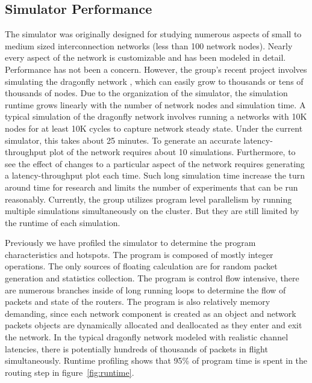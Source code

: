 \subsection{Simulator Performance}
The simulator was originally designed for studying numerous aspects of small to medium sized interconnection networks (less than 100 network nodes). Nearly every aspect of the network is customizable and has been modeled in detail. Performance has not been a concern. However, the group's recent project involves simulating the dragonfly network \cite{cdragon}, which can easily grow to thousands or tens of thousands of nodes. Due to the organization of the simulator, the simulation runtime grows linearly with the number of network nodes and simulation time. A typical simulation of the dragonfly network involves running a networks with 10K nodes for at least 10K cycles to capture network steady state. Under the current simulator, this takes about 25 minutes. To generate an accurate latency-throughput plot of the network requires about 10 simulations. Furthermore, to see the effect of changes to a particular aspect of the network requires generating a latency-throughput plot each time. Such long simulation time increase the turn around time for research and limits the number of experiments that can be run reasonably. Currently, the group utilizes program level parallelism by running multiple simulations simultaneously on the cluster. But they are still limited by the runtime of each simulation.

Previously we have profiled the simulator to determine the program characteristics and hotspots. The program is composed of mostly integer operations. The only sources of floating calculation are for random packet generation and statistics collection. The program is control flow intensive, there are numerous branches inside of long running loops to determine the flow of packets and state of the routers. The program is also relatively memory demanding, since each network component is created as an object and network packets objects are dynamically allocated and deallocated as they enter and exit the network. In the typical dragonfly network modeled with realistic channel latencies, there is potentially hundreds of thousands of packets in flight simultaneously. Runtime profiling shows that 95\% of program time is spent in the routing step in figure~\ref{fig:runtime}. 

